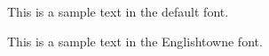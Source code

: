 \documentclass{article}
\begin{document}
This is a sample text in the default font.

{\englishtowne This is a sample text in the Englishtowne font.}


\end{document}
